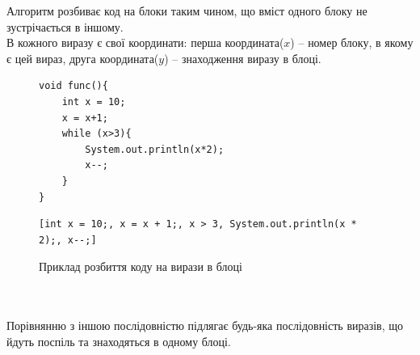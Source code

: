 \documentclass[a4paper, 14pt]{article}
\begin{document}
Алгоритм розбиває код на блоки таким чином, що вміст одного блоку не зустрічається в іншому. \\
В кожного виразу є свої координати: перша координата($x$) -- номер блоку, в якому є цей вираз, друга координата($y$) -- знаходження виразу в блоці.
\begin{figure}[h!]
\centering
\begin{minipage}{.4\textwidth}
\begin{lstlisting}[frame=none]
void func(){
	int x = 10;
	x = x+1;
	while (x>3){
		System.out.println(x*2);
		x--;
	}
}
\end{lstlisting}
\end{minipage}
\begin{minipage}{.5\textwidth}
\begin{lstlisting}[frame=none]
[int x = 10;, x = x + 1;, x > 3, System.out.println(x * 2);, x--;]
\end{lstlisting}
\end{minipage}
\caption{Приклад розбиття коду на вирази в блоці}
\end{figure} \\ \null \\
Порівнянню з іншою послідовністю підлягає будь-яка послідовність виразів, що йдуть поспіль та знаходяться в одному блоці. \\
\end{document}
